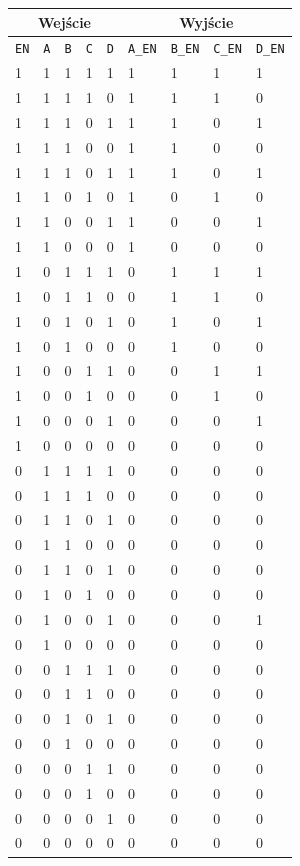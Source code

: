 \documentclass[a4paper]{article}
\begin{document}
\begin{center}
    \begin{tabular}{|l|l|l|l|l||l|l|l|l|}
    \hline
    \multicolumn{5}{|c||}{Wejście} & \multicolumn{4}{|c|}{Wyjście} \\\hline
    \verb|EN| &\verb|A| & \verb|B| & \verb|C| & \verb|D| & \verb|A_EN| & \verb|B_EN| & \verb|C_EN| & \verb|D_EN|  \\ \hline
    1 & 1 & 1 & 1 & 1 & 1 & 1 & 1 & 1 \\ \hline
    1 & 1 & 1 & 1 & 0 & 1 & 1 & 1 & 0 \\ \hline
    1 & 1 & 1 & 0 & 1 & 1 & 1 & 0 & 1 \\ \hline
    1 & 1 & 1 & 0 & 0 & 1 & 1 & 0 & 0 \\ \hline
    1 & 1 & 1 & 0 & 1 & 1 & 1 & 0 & 1 \\ \hline
    1 & 1 & 0 & 1 & 0 & 1 & 0 & 1 & 0 \\ \hline
    1 & 1 & 0 & 0 & 1 & 1 & 0 & 0 & 1 \\ \hline
    1 & 1 & 0 & 0 & 0 & 1 & 0 & 0 & 0 \\ \hline
    1 & 0 & 1 & 1 & 1 & 0 & 1 & 1 & 1 \\ \hline
    1 & 0 & 1 & 1 & 0 & 0 & 1 & 1 & 0 \\ \hline
    1 & 0 & 1 & 0 & 1 & 0 & 1 & 0 & 1 \\ \hline
    1 & 0 & 1 & 0 & 0 & 0 & 1 & 0 & 0 \\ \hline
    1 & 0 & 0 & 1 & 1 & 0 & 0 & 1 & 1 \\ \hline
    1 & 0 & 0 & 1 & 0 & 0 & 0 & 1 & 0 \\ \hline
    1 & 0 & 0 & 0 & 1 & 0 & 0 & 0 & 1 \\ \hline
    1 & 0 & 0 & 0 & 0 & 0 & 0 & 0 & 0 \\ \hline

    0 & 1 & 1 & 1 & 1 & 0 & 0 & 0 & 0 \\ \hline
    0 & 1 & 1 & 1 & 0 & 0 & 0 & 0 & 0 \\ \hline
    0 & 1 & 1 & 0 & 1 & 0 & 0 & 0 & 0 \\ \hline
    0 & 1 & 1 & 0 & 0 & 0 & 0 & 0 & 0 \\ \hline
    0 & 1 & 1 & 0 & 1 & 0 & 0 & 0 & 0 \\ \hline
    0 & 1 & 0 & 1 & 0 & 0 & 0 & 0 & 0 \\ \hline
    0 & 1 & 0 & 0 & 1 & 0 & 0 & 0 & 1 \\ \hline
    0 & 1 & 0 & 0 & 0 & 0 & 0 & 0 & 0 \\ \hline
    0 & 0 & 1 & 1 & 1 & 0 & 0 & 0 & 0 \\ \hline
    0 & 0 & 1 & 1 & 0 & 0 & 0 & 0 & 0 \\ \hline
    0 & 0 & 1 & 0 & 1 & 0 & 0 & 0 & 0 \\ \hline
    0 & 0 & 1 & 0 & 0 & 0 & 0 & 0 & 0 \\ \hline
    0 & 0 & 0 & 1 & 1 & 0 & 0 & 0 & 0 \\ \hline
    0 & 0 & 0 & 1 & 0 & 0 & 0 & 0 & 0 \\ \hline
    0 & 0 & 0 & 0 & 1 & 0 & 0 & 0 & 0 \\ \hline
    0 & 0 & 0 & 0 & 0 & 0 & 0 & 0 & 0 \\ \hline
    

\end{tabular}
\end{center}
\end{document}
